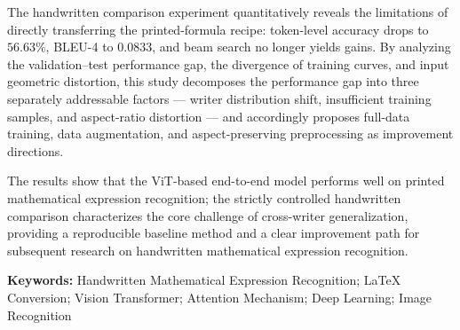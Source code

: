 The handwritten comparison experiment quantitatively reveals the limitations of directly transferring the printed-formula recipe: token-level accuracy drops to $56.63\%$, BLEU-4 to $0.0833$, and beam search no longer yields gains.
By analyzing the validation--test performance gap, the divergence of training curves, and input geometric distortion, this study decomposes the performance gap into three separately addressable factors --- writer distribution shift, insufficient training samples, and aspect-ratio distortion --- and accordingly proposes full-data training, data augmentation, and aspect-preserving preprocessing as improvement directions.

The results show that the ViT-based end-to-end model performs well on printed mathematical expression recognition; the strictly controlled handwritten comparison characterizes the core challenge of cross-writer generalization, providing a reproducible baseline method and a clear improvement path for subsequent research on handwritten mathematical expression recognition.

\vspace{0.5cm}
\noindent\textbf{Keywords:} Handwritten Mathematical Expression Recognition; LaTeX Conversion; Vision Transformer; Attention Mechanism; Deep Learning; Image Recognition

